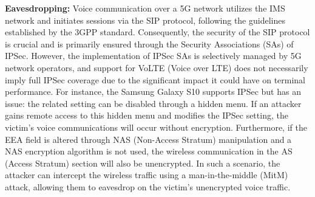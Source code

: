 \documentclass[english]{article}
\begin{document}
\textbf{Eavesdropping:} Voice communication over a 5G network utilizes the IMS
network and initiates sessions via the SIP protocol, following the guidelines
established by the 3GPP standard. Consequently, the security of the SIP protocol
is crucial and is primarily ensured through the Security Associations (SAs) of IPSec.
However, the implementation of IPSec SAs is selectively managed by 5G network operators,
and support for VoLTE (Voice over LTE) does not necessarily imply full IPSec coverage
due to the significant impact it could have on terminal performance. For instance,
the Samsung Galaxy S10 supports IPSec but has an issue: the related setting can be
disabled through a hidden menu. If an attacker gains remote access to this hidden
menu and modifies the IPSec setting, the victim's voice communications will occur
without encryption. Furthermore, if the EEA field is altered through NAS
(Non-Access Stratum) manipulation and a NAS encryption algorithm is not used,
the wireless communication in the AS (Access Stratum) section will also be unencrypted.
In such a scenario, the attacker can intercept the wireless traffic using a
man-in-the-middle (MitM) attack, allowing them to eavesdrop on the victim's
unencrypted voice traffic.
\\[0.2cm]
\end{document}
